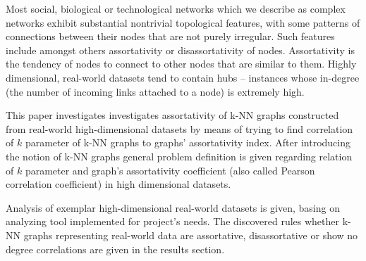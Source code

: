 Most social, biological or technological networks which we describe as complex networks exhibit substantial nontrivial topological features, with some patterns of connections between their nodes that are not purely irregular.
Such features include amongst others assortativity or disassortativity of nodes.
Assortativity is the tendency of nodes to connect to other nodes that are similar to them.
Highly dimensional, real-world datasets tend to contain hubs – instances whose in-degree (the number of incoming links attached to a node) is extremely high.

This paper investigates investigates assortativity of k-NN graphs constructed from real-world high-dimensional datasets by means of trying to find correlation of $k$ parameter of k-NN graphs to graphs' assortativity index.
After introducing the notion of k-NN graphs general problem definition is given regarding relation of $k$ parameter and graph's assortativity coefficient (also called Pearson correlation coefficient) in high dimensional datasets.

Analysis of exemplar high-dimensional real-world datasets is given, basing on analyzing tool implemented for project's needs.
The discovered rules whether k-NN graphs representing real-world data are assortative, disassortative or show no degree correlations are given in the results section.